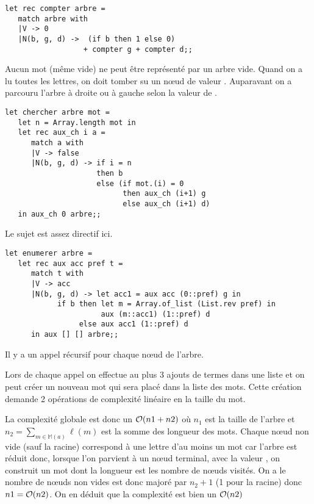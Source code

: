 \begin{Exercise}
\begin{lstlisting}
let rec compter arbre =
   match arbre with
   |V -> 0
   |N(b, g, d) ->  (if b then 1 else 0) 
                  + compter g + compter d;;
\end{lstlisting}
\end{Exercise} 
\begin{Exercise}Aucun mot (même vide) ne peut être représenté par un arbre vide. Quand on a lu toutes les lettres, on doit tomber su un nœud de valeur . Auparavant on a parcouru l'arbre à droite ou à gauche selon la valeur de .
\begin{lstlisting}
let chercher arbre mot = 
   let n = Array.length mot in
   let rec aux_ch i a =
      match a with
      |V -> false
      |N(b, g, d) -> if i = n
                     then b 
                     else (if mot.(i) = 0
                           then aux_ch (i+1) g
                           else aux_ch (i+1) d) 
   in aux_ch 0 arbre;;              
\end{lstlisting}
\end{Exercise} 
\begin{Exercise}Le sujet est assez directif ici.
\begin{lstlisting}
let enumerer arbre = 
   let rec aux acc pref t =
      match t with
      |V -> acc
      |N(b, g, d) -> let acc1 = aux acc (0::pref) g in
            if b then let m = Array.of_list (List.rev pref) in 
                      aux (m::acc1) (1::pref) d
                 else aux acc1 (1::pref) d
      in aux [] [] arbre;;
\end{lstlisting}
Il y a un appel récursif pour chaque nœud de l'arbre.

Lors de chaque appel on effectue au plus 3 ajouts de termes dans une liste et on peut créer un nouveau mot qui sera placé dans la liste des mots. Cette création demande 2 opérations de complexité linéaire en la taille du mot.

La complexité globale est donc un ${\cal O}(n1 + n2)$ où $n_1$ est la taille de l'arbre et $n_2=\sum_{m \in {\mathbb M}(a)}\ell(m)$ est la somme des longueur des mots. Chaque nœud non vide (sauf la racine) correspond à une lettre d'au moins un mot car l'arbre est réduit donc, lorsque l'on parvient à un nœud terminal, avec la valeur , on construit un mot dont la longueur est les nombre de nœuds visités. On a le nombre de nœuds non vides est donc majoré par $n_2+1$ (1 pour la racine) donc $n1={\cal O}( n2)$. On en déduit que la complexité est bien un ${\cal O}( n2)$
\end{Exercise} 
